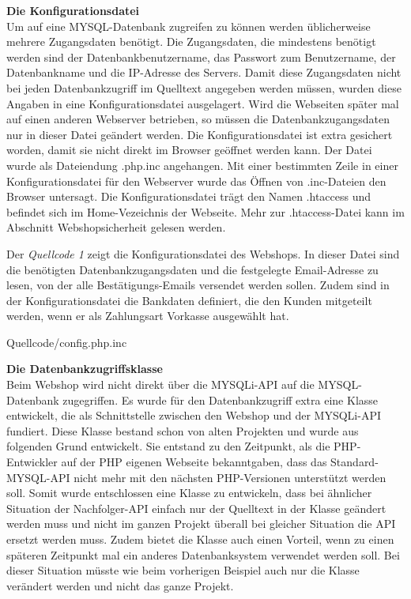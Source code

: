\textbf{Die Konfigurationsdatei}\\
Um auf eine MYSQL-Datenbank zugreifen zu können werden üblicherweise mehrere Zugangsdaten benötigt. Die Zugangsdaten, die mindestens benötigt werden sind der Datenbankbenutzername, das Passwort zum Benutzername, der Datenbankname und die IP-Adresse des Servers. Damit diese Zugangsdaten nicht bei jeden Datenbankzugriff im Quelltext angegeben werden müssen, wurden diese Angaben in eine Konfigurationsdatei ausgelagert. Wird die Webseiten später mal auf einen anderen Webserver betrieben, so müssen die Datenbankzugangsdaten nur in dieser Datei geändert werden. Die Konfigurationsdatei ist extra gesichert worden, damit sie nicht direkt im Browser geöffnet werden kann. Der Datei wurde als Dateiendung \glqq *.php.inc\grqq{} angehangen. Mit einer bestimmten Zeile in einer Konfigurationsdatei für den Webserver wurde das Öffnen von \glqq *.inc\grqq{}-Dateien den Browser untersagt. Die Konfigurationsdatei trägt den Namen \glqq .htaccess\grqq{} und befindet sich im Home-Vezeichnis der Webseite. Mehr zur \glqq .htaccess\grqq{}-Datei kann im Abschnitt \glqq Webshopsicherheit\grqq{} gelesen werden.

Der \textit{Quellcode 1} zeigt die Konfigurationsdatei des Webshops. In dieser Datei sind die benötigten Datenbankzugangsdaten und die festgelegte Email-Adresse zu lesen, von der alle Bestätigungs-Emails versendet werden sollen. Zudem sind in der Konfigurationsdatei die Bankdaten definiert, die den Kunden mitgeteilt werden, wenn er als Zahlungsart \glqq Vorkasse\grqq{} ausgewählt hat.

\newpage
\begin{center}
	\begin{lstinputlisting}[language=PHP, caption={Die Konfigurationsdatei}]
		{Quellcode/config.php.inc}
	\end{lstinputlisting}
\end{center}

\textbf{Die Datenbankzugriffsklasse}\\
Beim Webshop wird nicht direkt über die \glqq MYSQLi\grqq{}-API auf die MYSQL-Datenbank zugegriffen. Es wurde für den Datenbankzugriff extra eine Klasse entwickelt, die als Schnittstelle zwischen den Webshop und der \glqq MYSQLi\grqq{}-API fundiert. Diese Klasse bestand schon von alten Projekten und wurde aus folgenden Grund entwickelt. Sie entstand zu den Zeitpunkt, als die PHP-Entwickler auf der PHP eigenen Webseite bekanntgaben, dass das Standard-MYSQL-API nicht mehr mit den nächsten PHP-Versionen unterstützt werden soll. Somit wurde entschlossen eine Klasse zu entwickeln, dass bei ähnlicher Situation der Nachfolger-API einfach nur der Quelltext in der Klasse geändert werden muss und nicht im ganzen Projekt überall bei gleicher Situation die API ersetzt werden muss. Zudem bietet die Klasse auch einen Vorteil, wenn zu einen späteren Zeitpunkt mal ein anderes Datenbanksystem verwendet werden soll. Bei dieser Situation müsste wie beim vorherigen Beispiel auch nur die Klasse verändert werden und nicht das ganze Projekt.

